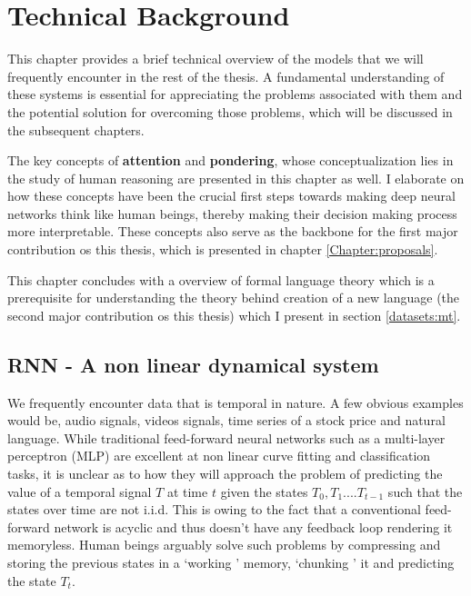 \chapter{Technical Background}\label{Chapter:Theory}
This chapter provides a brief technical overview of the models that we will frequently encounter in the rest of the thesis. A fundamental understanding of these systems is essential for appreciating the problems associated with them and the potential solution for overcoming those problems, which will be discussed in the subsequent chapters. 

The key concepts of \textbf{attention} and \textbf{pondering}, whose conceptualization lies in the study of human reasoning are presented in this chapter as well. I elaborate on how these concepts have been the crucial first steps towards making deep neural networks think like human beings, thereby making their decision making process more interpretable. These concepts also serve as the backbone for the first major contribution os this thesis, which is presented in chapter \ref{Chapter:proposals}.

This chapter concludes with a overview of formal language theory which is a prerequisite for understanding the theory behind creation of a new language (the second major contribution os this thesis) which I present in section \ref{datasets:mt}.

\section{RNN - A non linear dynamical system} \label{RNN}
We frequently encounter data that is temporal in nature. A few obvious examples would  be, audio signals, videos signals, time series of a stock price and natural language. While traditional feed-forward neural networks such as a multi-layer perceptron (MLP) \citep{rosenblatt1962} are excellent at non linear curve fitting and classification tasks, it is unclear as to how they will approach the problem of predicting the value of a temporal signal $T$ at time $t$ given the states $T_{0}, T_{1}....T_{t-1}$ such that the states over time are not i.i.d. This is owing to the fact that a conventional feed-forward network  is acyclic and thus doesn't have any feedback loop rendering it memoryless. Human beings arguably solve such problems by compressing and storing the previous states in a \lq working \rq{} memory,\citep{Miller1956} \lq chunking \rq{} it \citep{neath2013} \citep{craik2000} and predicting the state $T_t$. 


